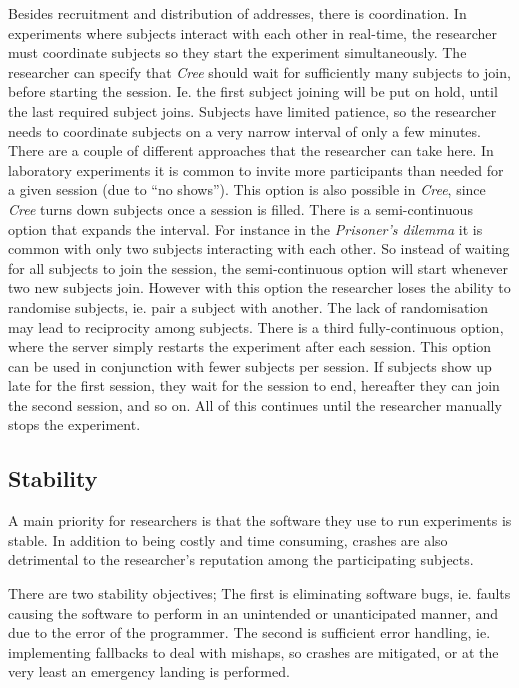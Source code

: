 \documentclass[preprint, 12pt]{elsarticle}
\newcommand{\Cree}{\emph{Cree}\xspace}
\begin{document}
Besides recruitment and distribution of addresses, there is coordination. In experiments where subjects interact with each other in real-time, the researcher must coordinate subjects so they start the experiment simultaneously. The researcher can specify that \Cree should wait for sufficiently many subjects to join, before starting the session. Ie. the first subject joining will be put on hold, until the last required subject joins. Subjects have limited patience, so the researcher needs to coordinate subjects on a very narrow interval of only a few minutes. There are a couple of different approaches that the researcher can take here. In laboratory experiments it is common to invite more participants than needed for a given session (due to ``no shows''). This option is also possible in \Cree, since \Cree turns down subjects once a session is filled. There is a semi-continuous option that expands the interval. For instance in the \emph{Prisoner's dilemma} it is common with only two subjects interacting with each other. So instead of waiting for all subjects to join the session, the semi-continuous option will start whenever two new subjects join. However with this option the researcher loses the ability to randomise subjects, ie. pair a subject with another. The lack of randomisation may lead to reciprocity among subjects. There is a third fully-continuous option, where the server simply restarts the experiment after each session. This option can be used in conjunction with fewer subjects per session. If subjects show up late for the first session, they wait for the session to end, hereafter they can join the second session, and so on. All of this continues until the researcher manually stops the experiment.

\subsection{Stability}

A main priority for researchers is that the software they use to run experiments is stable. In addition to being costly and time consuming, crashes are also detrimental to the researcher's reputation among the participating subjects. 

There are two stability objectives; The first is eliminating software bugs, ie. faults causing the software to perform in an unintended or unanticipated manner, and due to the error of the programmer. The second is sufficient error handling, ie. implementing fallbacks to deal with mishaps, so crashes are mitigated, or at the very least an emergency landing is performed.
\end{document}
